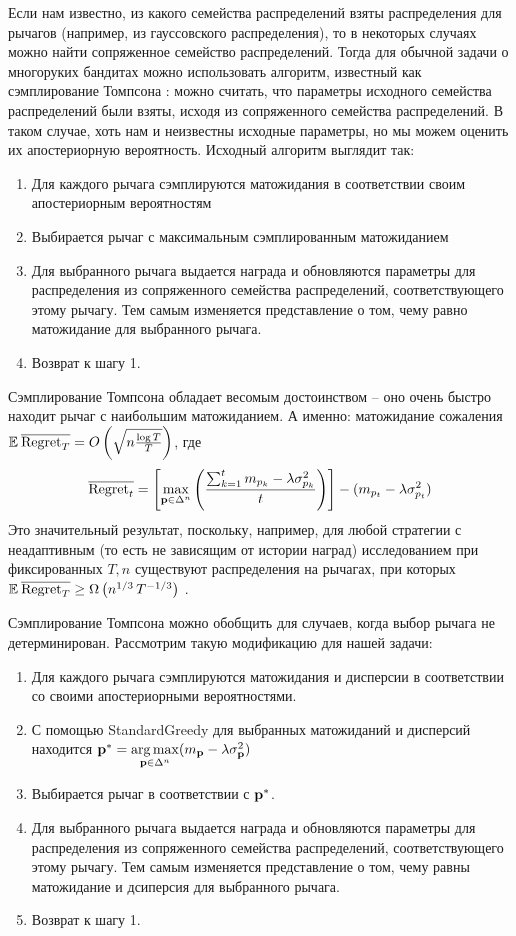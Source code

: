 Если нам известно, из какого семейства распределений взяты распределения для рычагов (например, из гауссовского распределения), то в некоторых случаях можно найти сопряженное семейство распределений. Тогда для обычной задачи о многоруких бандитах можно использовать алгоритм, известный как сэмплирование Томпсона \cite{intro_bandits}: можно считать, что параметры исходного семейства распределений были взяты, исходя из сопряженного семейства распределений. В таком случае, хоть нам и неизвестны исходные параметры, но мы можем оценить их апостериорную вероятность. Исходный алгоритм выглядит так:
\begin{enumerate}
    \item Для каждого рычага сэмплируются матожидания в соответствии своим апостериорным вероятностям
    \item Выбирается рычаг с максимальным сэмплированным матожиданием
    \item Для выбранного рычага выдается награда и обновляются параметры для распределения из сопряженного семейства распределений, соответствующего этому рычагу. Тем самым изменяется представление о том, чему равно матожидание для выбранного рычага.
    \item Возврат к шагу 1.
\end{enumerate}
Сэмплирование Томпсона обладает весомым достоинством -- оно очень быстро находит рычаг с наибольшим матожиданием. А именно: матожидание сожаления $\mathbb{E} \: \overline{\text{Regret}_T} = O\left(\sqrt{n \frac{\log T}{T}} \right)$, где
\[
\overline{\text{Regret}_t} = \left[ \underset{\textbf{p} \in \Delta^n}{\max} \left( \frac{\sum_{k=1}^t m_{p_k} - \lambda \sigma_{p_k}^2}{t} \right) \right] - (m_{p_t} - \lambda \sigma_{p_t}^2)
\]
Это значительный результат, поскольку, например, для любой стратегии с неадаптивным (то есть не зависящим от истории наград) исследованием при фиксированных $T, n$ существуют распределения на рычагах, при которых  $\mathbb{E} \: \overline{\text{Regret}_T} \geq \Omega \left(n^{1/3} \, T^{-1/3} \right)$ \cite{intro_bandits_slow_convergence}.

Сэмплирование Томпсона можно обобщить для случаев, когда выбор рычага не детерминирован. Рассмотрим такую модификацию для нашей задачи:
\begin{enumerate}
    \item Для каждого рычага сэмплируются матожидания и дисперсии в соответствии со своими апостериорными вероятностями.
    \item С помощью StandardGreedy для выбранных матожиданий и дисперсий находится $\textbf{p}^* = \underset{\textbf{p} \in \Delta^n}{\arg \max} (m_{\textbf{p}} - \lambda \sigma_{\textbf{p}}^2)$
    \item Выбирается рычаг в соответствии с $\textbf{p}^*$.
    \item Для выбранного рычага выдается награда и обновляются параметры для распределения из сопряженного семейства распределений, соответствующего этому рычагу. Тем самым изменяется представление о том, чему равны матожидание и дсиперсия для выбранного рычага.
    \item Возврат к шагу 1.
\end{enumerate}

